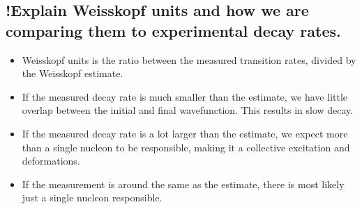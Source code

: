 \documentclass{article}
\begin{document}
\subsection{!Explain Weisskopf units and how we are comparing them to experimental decay rates.}
\begin{itemize}
    \item Weisskopf units is the ratio between the measured transition rates, divided by the Weisskopf estimate. 
    \item If the measured decay rate is much smaller than the estimate, we have little overlap between the initial and final wavefunction. This results in slow decay. 
    \item If the measured decay rate is a lot larger than the estimate, we expect more than a single nucleon to be responsible, making it a collective excitation and deformations. 
    \item If the measurement is around the same as the estimate, there is most likely just a single nucleon responsible.    
\end{itemize}
\end{document}

